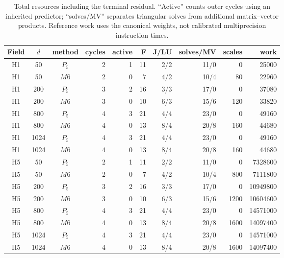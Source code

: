 \begin{table}[htbp]
\centering\scriptsize
\setlength{\tabcolsep}{3pt}
\caption{Total resources including the terminal residual. ``Active'' counts outer cycles using an inherited predictor; ``solves/MV'' separates triangular solves from additional matrix--vector products. Reference work uses the canonical weights, not calibrated multiprecision instruction times.}\label{tab:ext-res-external6}
\begin{tabular}{cccrrrrrrr}\toprule
Field & $d$ & method & cycles & active & F & J/LU & solves/MV & scales & work\\\midrule
H1 & 50 & $P_{5}$ & 2 & 1 & 11 & 2/2 & 11/0 & 0 & 25000\\
H1 & 50 & $M6$ & 2 & 0 & 7 & 4/2 & 10/4 & 80 & 22960\\
H1 & 200 & $P_{5}$ & 3 & 2 & 16 & 3/3 & 17/0 & 0 & 37080\\
H1 & 200 & $M6$ & 3 & 0 & 10 & 6/3 & 15/6 & 120 & 33820\\
H1 & 800 & $P_{5}$ & 4 & 3 & 21 & 4/4 & 23/0 & 0 & 49160\\
H1 & 800 & $M6$ & 4 & 0 & 13 & 8/4 & 20/8 & 160 & 44680\\
H1 & 1024 & $P_{5}$ & 4 & 3 & 21 & 4/4 & 23/0 & 0 & 49160\\
H1 & 1024 & $M6$ & 4 & 0 & 13 & 8/4 & 20/8 & 160 & 44680\\
H5 & 50 & $P_{5}$ & 2 & 1 & 11 & 2/2 & 11/0 & 0 & 7328600\\
H5 & 50 & $M6$ & 2 & 0 & 7 & 4/2 & 10/4 & 800 & 7111800\\
H5 & 200 & $P_{5}$ & 3 & 2 & 16 & 3/3 & 17/0 & 0 & 10949800\\
H5 & 200 & $M6$ & 3 & 0 & 10 & 6/3 & 15/6 & 1200 & 10604600\\
H5 & 800 & $P_{5}$ & 4 & 3 & 21 & 4/4 & 23/0 & 0 & 14571000\\
H5 & 800 & $M6$ & 4 & 0 & 13 & 8/4 & 20/8 & 1600 & 14097400\\
H5 & 1024 & $P_{5}$ & 4 & 3 & 21 & 4/4 & 23/0 & 0 & 14571000\\
H5 & 1024 & $M6$ & 4 & 0 & 13 & 8/4 & 20/8 & 1600 & 14097400\\
\bottomrule\end{tabular}
\end{table}
\FloatBarrier
